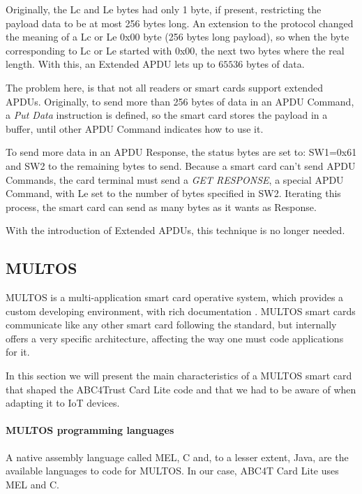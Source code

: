 Originally, the Lc and Le bytes had only 1 byte, if present, restricting the payload data to be at most 256 bytes long. An extension to the protocol changed the meaning of a Lc or Le 0x00 byte (256 bytes long payload), so when the byte corresponding to Lc or Le started with 0x00, the next two bytes where the real length.  With this, an Extended APDU lets up to $65536$ bytes of data.

The problem here, is that not all readers or smart cards support extended APDUs. Originally, to send more than 256 bytes of data in an APDU Command, a \textit{Put Data} instruction is defined, so the smart card stores the payload in a buffer, until other APDU Command indicates how to use it.

To send more data in an APDU Response, the status bytes are set to: SW1=0x61 and SW2 to the remaining bytes to send. Because a smart card can't send APDU Commands, the card terminal must send a \textit{GET RESPONSE}, a special APDU Command, with Le set to the number of bytes specified in SW2. Iterating this process, the smart card can send as many bytes as it wants as Response.

With the introduction of Extended APDUs, this technique is no longer needed.






\subsection{MULTOS}

MULTOS is a multi-application smart card operative system, which provides a custom developing environment, with rich documentation \citep{MultosTechLib}. MULTOS smart cards communicate like any other smart card following the standard, but internally offers a very specific architecture, affecting the way one must code applications for it.

In this section we will present the main characteristics of a MULTOS smart card that shaped the ABC4Trust Card Lite code and that we had to be aware of when adapting it to IoT devices.

\paragraph{MULTOS programming languages} A native assembly language called MEL, C and, to a lesser extent, Java, are the available languages to code for MULTOS. In our case, ABC4T Card Lite uses MEL and C.


